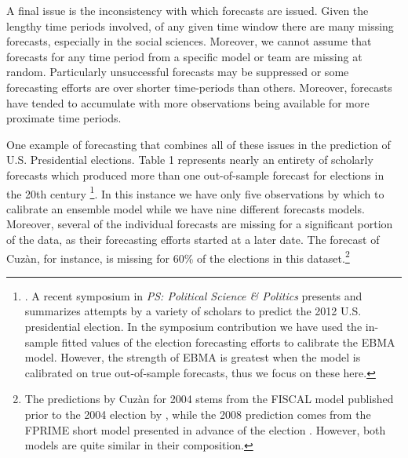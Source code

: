 \documentclass[12pt,fullpage,endnotes]{article}
\begin{document}
A final issue is the inconsistency with which forecasts are
issued. Given the lengthy time periods involved, of any given time
window there are many missing forecasts, especially in the social sciences.  Moreover, we cannot assume
that forecasts for any time period from a specific model or team are
missing at random.  Particularly unsuccessful forecasts may be
suppressed or some forecasting efforts are over shorter time-periods than others. Moreover, forecasts have tended to accumulate with more
observations being available for more proximate time periods.

One example of forecasting that combines all of these issues in the
prediction of U.S. Presidential elections.  Table 1 represents nearly an
entirety of scholarly forecasts which produced more than one out-of-sample forecast
for elections in the 20th century \footnote{
\cite[See, for example]{Fair:2009,Fair2011,Abramowitz:2008,Campbell:2008,Cuzan:2004,Cuzan:Bundrick:2008,hibbs:2012,Lockerbie:2008,Erikson:Wlezien:2008,Graefe:2010,Holbrook:2008}.
A recent symposium in {\em	 PS: Political Science \& Politics} presents and summarizes attempts by a variety of scholars to predict the 2012 U.S. presidential election. In the symposium contribution we have used the in-sample fitted values of the election forecasting efforts to calibrate the EBMA model. However, the strength of EBMA is greatest when the model is calibrated on true out-of-sample forecasts, thus we focus on these here.}.  In this instance
we have only five observations by which to calibrate an ensemble model while we
have nine different forecasts models.  Moreover, several of the individual forecasts
are missing for a significant portion of the data, as their forecasting efforts started at a later date. The forecast of
Cuz\`an, for instance, is missing for 60\% of the elections in this
dataset.\footnote{The predictions by Cuz\`an for 2004 stems from the FISCAL model published prior to the 2004 election by \citet{Cuzan:2004}, while the 2008 prediction comes from the FPRIME short model presented in advance of the election \citep{Cuzan:Bundrick:2008}. However, both models are quite similar in their composition.} 
\end{document}
